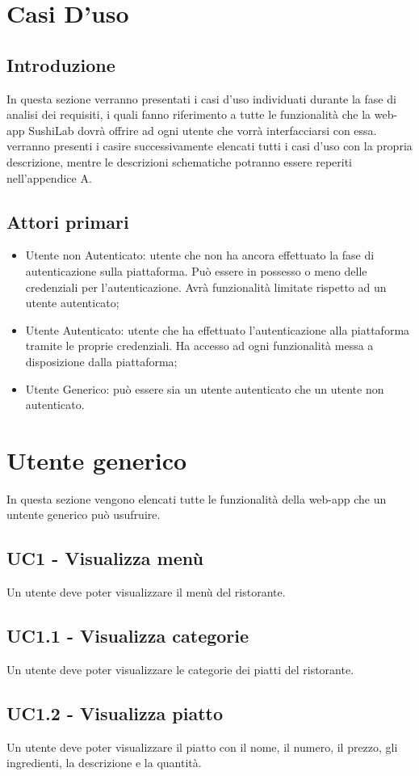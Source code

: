 \section{Casi D'uso}
\subsection{Introduzione }
In questa sezione verranno presentati i casi d'uso individuati durante la fase di analisi dei requisiti, i quali fanno riferimento a tutte le funzionalità che la web-app SushiLab dovrà offrire ad ogni utente che vorrà interfacciarsi con essa. verranno presenti i casire successivamente elencati tutti i casi d'uso con la propria descrizione, mentre le descrizioni schematiche potranno essere reperiti nell'appendice A.
\subsection{Attori primari}
\begin{itemize}
    \item Utente non Autenticato: utente che non ha ancora effettuato la fase di autenticazione sulla piattaforma. Può essere in possesso o meno delle credenziali per l'autenticazione. Avrà funzionalità limitate rispetto ad un utente autenticato;
    \item Utente Autenticato: utente che ha effettuato l'autenticazione alla piattaforma tramite le proprie credenziali. Ha accesso ad ogni funzionalità messa a disposizione dalla piattaforma;
    \item  Utente Generico: può essere sia un utente autenticato che un utente non autenticato.
\end{itemize}
\section{Utente generico}
In questa sezione vengono elencati tutte le funzionalità della web-app che un untente generico può usufruire.
\subsection{UC1 - Visualizza menù}
Un utente deve poter visualizzare il menù del ristorante.
\subsection{UC1.1 - Visualizza categorie}
Un utente deve poter visualizzare le categorie dei piatti del ristorante.
\subsection{UC1.2 - Visualizza piatto}
Un utente deve poter visualizzare il piatto con il nome, il numero, il prezzo, gli ingredienti, la descrizione e la quantità.
